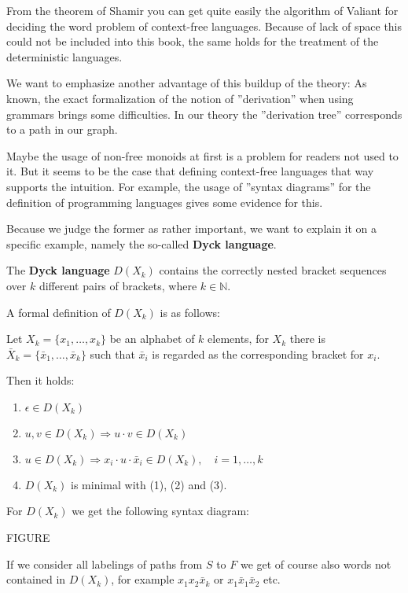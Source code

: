 From the theorem of Shamir you can get quite easily the algorithm of Valiant for
deciding the word problem of context-free languages. Because of lack of space
this could not be included into this book, the same holds for the treatment of
the  deterministic languages.

We want to emphasize another advantage of this buildup of the theory: As
known, the exact formalization of the notion of ''derivation'' when using
grammars brings some difficulties. In our theory the ''derivation tree''
corresponds to a path in our graph.

Maybe the usage of non-free monoids at first is a problem for readers not used to it. 
But it seems to be the case that defining context-free
languages that way supports the intuition. For example, the usage of ''syntax
diagrams'' for the definition of programming languages gives some evidence for
this.

Because we judge the former as rather important, we want to explain it on a
specific example, namely the so-called {\bf Dyck language}.

The {\bf Dyck language} $D(X_k)$ contains the correctly nested bracket sequences
over $k$ different pairs of brackets, where $k \in \mathbb{N}$.

A formal definition of $D(X_k)$ is as follows:

Let $X_k = \{ x_1, \ldots, x_k \}$ be an alphabet of $k$ elements, for $X_k$
there is $\bar{X}_k = \{ \bar{x}_1, \ldots, \bar{x}_k \}$ such that $\bar{x}_i$
is regarded as the corresponding bracket for $x_i$.

Then it holds:

\begin{enumerate}
  \item $\epsilon \in D(X_k)$
  \item $u, v \in D(X_k) \Rightarrow u \cdot v \in D(X_k)$
  \item $u \in D(X_k) \Rightarrow x_i \cdot u \cdot \bar{x}_i \in D(X_k),\quad i
  = 1, \ldots, k$
  \item $D(X_k)$ is minimal with (1), (2) and (3). 
\end{enumerate}

For $D(X_k)$ we get the following syntax diagram:

FIGURE

If we consider all labelings of paths from $S$ to $F$ we get of course also
words not contained in $D(X_k)$, for example $x_1 x_2 \bar{x}_k$ or $x_1
\bar{x}_1 \bar{x}_2$ etc.

